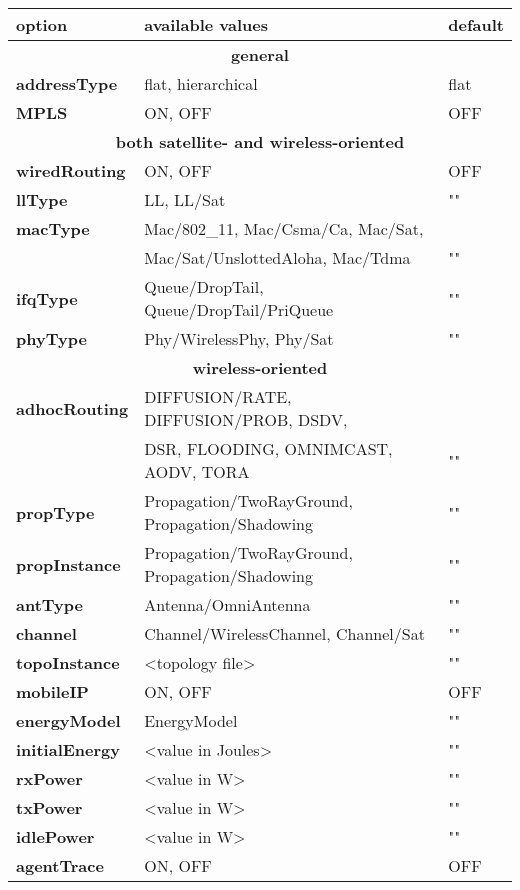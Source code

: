 \begin{table}[ht]
\label{table:nodeconfig}
\begin{center} 
{\footnotesize
\begin{tabular}{|l|l|l|}\hline
{\bf option} & {\bf available values} & {\bf default}\\\hline\hline 
\multicolumn{3}{|c|}{\bf general} \\\hline
{\bf addressType} & flat, hierarchical & flat\\\hline
{\bf MPLS} & ON, OFF & OFF\\\hline
\multicolumn{3}{|c|}{\bf both satellite- and wireless-oriented} \\\hline
{\bf wiredRouting} & ON, OFF & OFF\\\hline
{\bf llType} & LL, LL/Sat & "" \\\hline
{\bf macType} & Mac/802\_11, Mac/Csma/Ca, Mac/Sat, & \\ 
& Mac/Sat/UnslottedAloha, Mac/Tdma & "" \\\hline
{\bf ifqType} & Queue/DropTail, Queue/DropTail/PriQueue & "" \\\hline
{\bf phyType} & Phy/WirelessPhy, Phy/Sat& "" \\\hline
\multicolumn{3}{|c|}{\bf wireless-oriented} \\\hline
{\bf adhocRouting} & DIFFUSION/RATE, DIFFUSION/PROB, DSDV, & \\
& DSR, FLOODING, OMNIMCAST, AODV, TORA & ""\\\hline
{\bf propType} & Propagation/TwoRayGround, Propagation/Shadowing & ""\\\hline
{\bf propInstance} & Propagation/TwoRayGround, Propagation/Shadowing & ""\\\hline
{\bf antType} & Antenna/OmniAntenna & ""\\\hline
{\bf channel} & Channel/WirelessChannel, Channel/Sat & ""\\\hline
{\bf topoInstance} & <topology file> & ""\\\hline
{\bf mobileIP} & ON, OFF& OFF \\\hline
{\bf energyModel} & EnergyModel & "" \\\hline
{\bf initialEnergy} & <value in Joules> & "" \\\hline
{\bf rxPower} & <value in W> & "" \\\hline
{\bf txPower} & <value in W> & "" \\\hline
{\bf idlePower} & <value in W> & "" \\\hline
{\bf agentTrace} & ON, OFF & OFF \\\hline

\end{tabular}}
\end{center}
\end{table}
